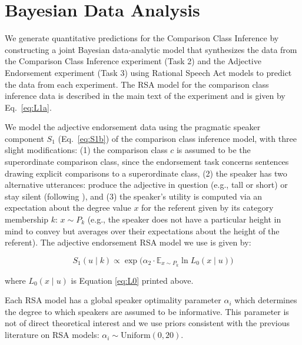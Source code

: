 \documentclass[doc]{apa6}
\begin{document}

\section{Bayesian Data Analysis}

We generate quantitative predictions for the Comparison Class Inference by constructing a joint Bayesian data-analytic model that synthesizes the data from the Comparison Class Inference experiment (Task 2) and the Adjective Endorsement experiment (Task 3) using Rational Speech Act models to predict the data from each experiment. 
The RSA model for the comparison class inference data is described in the main text of the experiment and is given by Eq.~\ref{eq:L1a}. 

We model the adjective endorsement data using the pragmatic speaker component $S_1$ (Eq.~\ref{eq:S1b}) of the comparison class inference model, with three slight modifications: (1) the comparison class $c$ is assumed to be the superordinate comparison class, since the endorsement task concerns sentences drawing explicit comparisons to a superordinate class, (2) the speaker has two alternative utterances: produce the adjective in question (e.g., tall or short) or stay silent  (following ), and (3) the speaker's utility is computed via an expectation about the degree value $x$ for the referent given by its category membership $k$: $x\sim P_k$ (e.g., the speaker does not have a particular height in mind to convey but averages over their expectations about the height of the referent).
The adjective endorsement RSA model we use is given by: 

\begin{equation}
S_{1}(u \mid k) \propto \exp{(\alpha_2 \cdot {\mathbb E}_{x\sim P_k}} \ln{L_0(x \mid u)}) \label{eq:S1a}
\end{equation} 

\noindent where $L_0(x \mid u)$ is Equation \ref{eq:L0} printed above.

Each RSA model has a global speaker optimality parameter $\alpha_{i}$ which determines the degree to which speakers are assumed to be informative.
This parameter is not of direct theoretical interest and we use priors consistent with the previous literature on RSA models: $\alpha_i \sim \text{Uniform}(0, 20)$.
\end{document}

